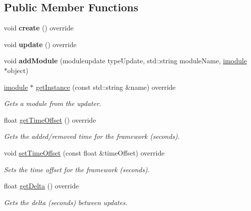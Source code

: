 \subsection*{Public Member Functions}
\begin{DoxyCompactItemize}
\item 
\mbox{\label{classflounder_1_1glfwupdater_acd58077965d5ba137961c567d7d79aa9}} 
void {\bfseries create} () override
\item 
\mbox{\label{classflounder_1_1glfwupdater_a2443d270f702e67ab44c7afb88c71a5e}} 
void {\bfseries update} () override
\item 
\mbox{\label{classflounder_1_1glfwupdater_a3c550a8e0d269a3fe13bef4d9015477a}} 
void {\bfseries add\+Module} (moduleupdate type\+Update, std\+::string module\+Name, \hyperlink{classflounder_1_1imodule}{imodule} $\ast$object)
\item 
\hyperlink{classflounder_1_1imodule}{imodule} $\ast$ \hyperlink{classflounder_1_1glfwupdater_a284945635b93ffc1bd6164ff20565349}{get\+Instance} (const std\+::string \&name) override
\begin{DoxyCompactList}\small\item\em Gets a module from the updater. \end{DoxyCompactList}\item 
float \hyperlink{classflounder_1_1glfwupdater_a7d37c7454419a6756c56b3a6412f6d20}{get\+Time\+Offset} () override
\begin{DoxyCompactList}\small\item\em Gets the added/removed time for the framework (seconds). \end{DoxyCompactList}\item 
void \hyperlink{classflounder_1_1glfwupdater_a2cffca6ed4a79dd5d8cc658ca20c70ef}{set\+Time\+Offset} (const float \&time\+Offset) override
\begin{DoxyCompactList}\small\item\em Sets the time offset for the framework (seconds). \end{DoxyCompactList}\item 
float \hyperlink{classflounder_1_1glfwupdater_adfe51aba1c2ac7c79d385eed15c901fc}{get\+Delta} () override
\begin{DoxyCompactList}\small\item\em Gets the delta (seconds) between updates. \end{DoxyCompactList}\item 

\end{DoxyCompactItemize}
